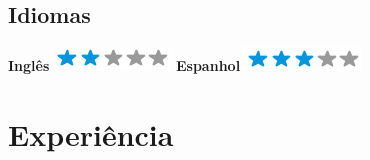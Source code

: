 \documentclass[]{friggeri-cv}
\begin{document}
\begin{aside}
    \section{Idiomas}
    \singlespacing
    \textbf{Inglês}\includegraphics[scale=0.40]{img/2stars.png}
    \textbf{Espanhol}\includegraphics[scale=0.40]{img/3stars.png}
    
\end{aside}

\singlespacing
\section{Experiência}
\end{document}
